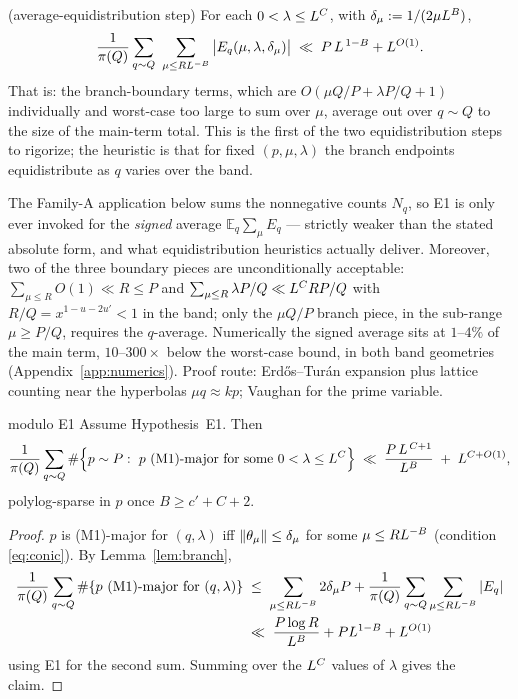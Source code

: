 \begin{hypothesis}\label{hyp:E1}
\statusO{} (average-equidistribution step)\quad
For each $0<\lambda\le L^{C}$, with $\delta_\mu:=1/(2\mu L^{B})$,
\[
\frac{1}{\pi(Q)}\sum_{q\sim Q}\
\sum_{\mu\le RL^{-B}}\big|E_q(\mu,\lambda,\delta_\mu)\big|
\;\ll\;P\,L^{\,1-B}+L^{O(1)} .
\]
That is: the branch-boundary terms, which are $O(\mu Q/P+\lambda P/Q+1)$
individually and worst-case too large to sum over $\mu$, average out over
$q\sim Q$ to the size of the main-term total. This is the first of the
two equidistribution steps to rigorize; the heuristic is that for fixed
$(p,\mu,\lambda)$ the branch endpoints equidistribute as $q$ varies over
the band.
\end{hypothesis}

\begin{remark}
\label{rem:E1-signed}
The Family-A application below sums the nonnegative counts $N_q$, so
E1 is only ever invoked for the \emph{signed} average
$\mathbb E_q\sum_\mu E_q$ --- strictly weaker than the stated absolute
form, and what equidistribution heuristics actually deliver. Moreover,
two of the three boundary pieces are unconditionally acceptable:
$\sum_{\mu\le R}O(1)\ll R\le P$ and
$\sum_{\mu\le R}\lambda P/Q\ll L^{C}RP/Q$ with $R/Q=x^{1-u-2u'}<1$
in the band; only the $\mu Q/P$ branch piece, in the sub-range
$\mu\ge P/Q$, requires the $q$-average. Numerically the signed average
sits at $1$--$4\%$ of the main term, $10$--$300\times$ below the
worst-case bound, in both band geometries
(Appendix~\ref{app:numerics}). Proof route: Erd\H os--Tur\'an expansion
plus lattice counting near the hyperbolas $\mu q\approx kp$; Vaughan
for the prime variable.
\end{remark}

\begin{proposition}[Family A count]\label{prop:familyA}
\statusP{} modulo E1\quad
Assume Hypothesis~E1. Then
\[
\frac{1}{\pi(Q)}\sum_{q\sim Q}
\#\Big\{p\sim P:\ p\ \text{(M1)-major for some }
0<\lambda\le L^{C}\Big\}
\;\ll\;\frac{P\,L^{\,C+1}}{L^{B}}\;+\;L^{C+O(1)} ,
\]
polylog-sparse in $p$ once $B\ge c'+C+2$.
\end{proposition}

\begin{proof}
$p$ is (M1)-major for $(q,\lambda)$ iff
$\left\| \theta_\mu\right\|\le\delta_\mu$ for some $\mu\le RL^{-B}$
(condition \eqref{eq:conic}). By Lemma~\ref{lem:branch},
\begin{align*}
\frac{1}{\pi(Q)}\sum_{q\sim Q}\#\{p\ \text{(M1)-major for }(q,\lambda)\}
&\;\le\;\sum_{\mu\le RL^{-B}}2\delta_\mu P
+\frac{1}{\pi(Q)}\sum_{q\sim Q}\sum_{\mu\le RL^{-B}}|E_q|\\
&\;\ll\;\frac{P\log R}{L^{B}}+PL^{1-B}+L^{O(1)}
\end{align*}
using E1 for the second sum. Summing over the $L^{C}$ values of
$\lambda$ gives the claim.
\end{proof}

